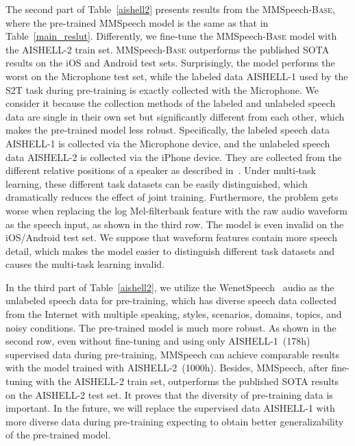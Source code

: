 \documentclass{article}
\begin{document}
The second part of Table~\ref{aishell2} presents results from the MMSpeech-\textsc{Base}, where the pre-trained MMSpeech model is the same as that in Table~\ref{main_reslut}. Differently, we fine-tune the MMSpeech-\textsc{Base} model with the AISHELL-2 train set. MMSpeech-\textsc{Base} outperforms the published SOTA results on the iOS and Android test sets. Surprisingly, the model performs the worst on the Microphone test set, while the labeled data AISHELL-1 used by the S2T task during pre-training is exactly collected with the Microphone. We consider it because the collection methods of the labeled and unlabeled speech data are single in their own set but significantly different from each other, which makes the pre-trained model less robust. Specifically, the labeled speech data AISHELL-1 is collected via the Microphone device, and the unlabeled speech data AISHELL-2 is collected via the iPhone device. They are collected from the different relative positions of a speaker as described in~\cite{du2018aishell}. Under multi-task learning, these different task datasets can be easily distinguished, which dramatically reduces the effect of joint training. Furthermore, the problem gets worse when replacing the log Mel-filterbank feature with the raw audio waveform as the speech input, as shown in the third row. The model is even invalid on the iOS/Android test set. We suppose that waveform features contain more speech detail, which makes the model easier to distinguish different task datasets and causes the multi-task learning invalid.

In the third part of Table~\ref{aishell2}, we utilize the WenetSpeech~\cite{zhang2022wenetspeech} audio as the unlabeled speech data for pre-training, which has diverse speech data collected from the Internet with multiple speaking, styles, scenarios, domains, topics, and noisy conditions. The pre-trained model is much more robust. As shown in the second row, even without fine-tuning and using only AISHELL-1~(178h) supervised data during pre-training, MMSpeech can achieve comparable results with the model trained with AISHELL-2~(1000h). Besides, MMSpeech, after fine-tuning with the AISHELL-2 train set, outperforms the published SOTA results on the AISHELL-2 test set. It proves that the diversity of pre-training data is important. In the future, we will replace the supervised data AISHELL-1 with more diverse data during pre-training expecting to obtain better generalizability of the pre-trained model.
\end{document}

